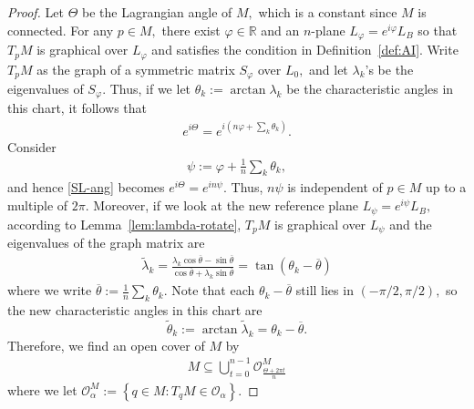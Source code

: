 \documentclass[11pt]{amsart}
\numberwithin{equation}{section}
\theoremstyle{definition}
\theoremstyle{definition}
\newcommand{\ovl}[1]{\overline{#1}}
\newcommand{\set}[1]{\left\{#1\right\}}
\newcommand{\pr}[1]{\left(#1\right)}
\newcommand{\bb}[1]{\mathbb{#1}} \newcommand{\td}[1]{\widetilde{#1}}
\newcommand{\sbst}{\subseteq}
\begin{document}
\begin{proof}
    Let $\Theta$ be the Lagrangian angle of $M,$ which is a constant since $M$ is connected.
    For any $p\in M,$ there exist $\varphi\in\bb R$ and an $n$-plane $L_\varphi=e^{i\varphi}L_B$ so that $T_pM$ is graphical over $L_\varphi$ and satisfies the condition in Definition~\ref{def:AI}.
    Write $T_pM$ as the graph of a symmetric matrix $S_\varphi$ over $L_0,$ and let $\lambda_k$'s be the eigenvalues of $S_\varphi.$
    Thus, if we let $\theta_k:=\arctan \lambda_k$ be the characteristic angles in this chart, it follows that
    \begin{align}\label{SL-ang}
    e^{i\Theta} = e^{i\pr{n\varphi + \sum_k\theta_k}}.
    \end{align}
    Consider
    \begin{align*}
    \psi:=\varphi + \frac 1n \sum_k\theta_k,
    \end{align*}
    and hence \eqref{SL-ang} becomes $e^{i\Theta} = e^{in\psi}.$
    Thus, $n\psi$ is independent of $p\in M$ up to a multiple of $2\pi.$
    Moreover, if we look at the new reference plane $L_\psi=e^{i\psi}L_B,$ according to Lemma~\ref{lem:lambda-rotate}, $T_pM$ is graphical over $L_\psi$ and the eigenvalues of the graph matrix are
    \begin{align*}
    \td \lambda_k 
    = \frac{\lambda_k\cos\ovl\theta - \sin\ovl\theta}{\cos\ovl\theta + \lambda_k\sin\ovl\theta}
    = \tan(\theta_k-\ovl\theta)
    \end{align*}
    where we write $\ovl\theta:=\frac 1n \sum_k\theta_k.$
    Note that each $\theta_k-\ovl\theta$ still lies in $(-\pi/2,\pi/2),$ so the new characteristic angles in this chart are
    $$\td\theta_k:=\arctan\td\lambda_k=\theta_k-\ovl\theta.$$
    Therefore, we find an open cover of $M$ by
    \begin{align*}
    M\sbst \bigcup_{t=0}^{n-1}
    \mathcal O^M_{\frac{\Theta+2\pi t}n}
    \end{align*}
    where we let $\mathcal O^M_\alpha
    := \set{q\in M:T_qM\in \mathcal O_\alpha}.$
    

\end{proof}
\end{document}
